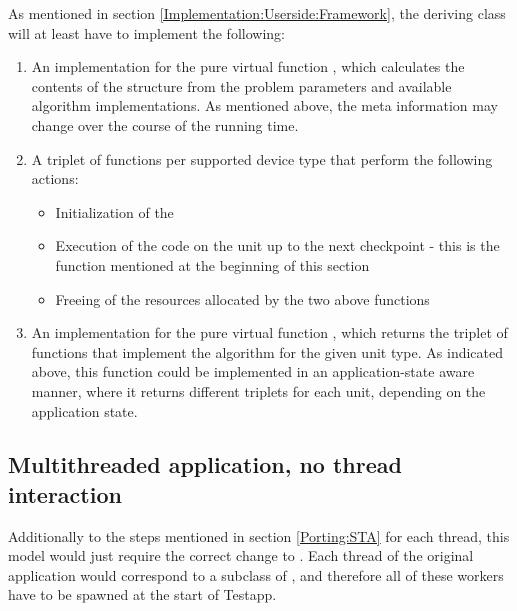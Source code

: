 As mentioned in section \ref{Implementation:Userside:Framework}, the deriving class will at least have to implement the following:
\begin{enumerate}
	\item An implementation for the pure virtual function , which calculates the contents of the  structure from the problem parameters and available algorithm implementations. As mentioned above, the meta information may change over the course of the running time.
	\item A triplet of functions per supported device type that perform the following actions:
	\begin{itemize}
		\item Initialization of the \cu{}
		\item Execution of the code on the unit up to the next checkpoint - this is the  function mentioned at the beginning of this section
		\item Freeing of the resources allocated by the two above functions
	\end{itemize}
	\item An implementation for the pure virtual function , which returns the triplet of functions that implement the algorithm for the given unit type. As indicated above, this function could be implemented in an application-state aware manner, where it returns different triplets for each unit, depending on the application state.
\end{enumerate}

\subsection{Multithreaded application, no thread interaction}
\label{Porting:MTAnti}
Additionally to the steps mentioned in section \ref{Porting:STA} for each thread, this model would just require the correct change to . Each thread of the original application would correspond to a subclass of , and therefore all of these workers have to be spawned at the start of Testapp.

